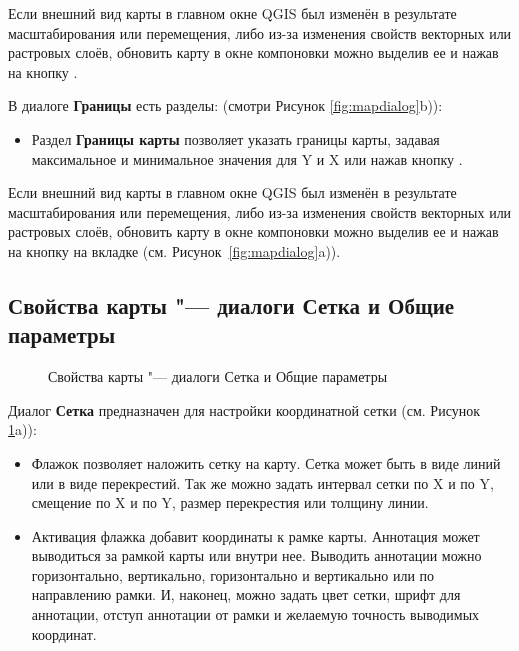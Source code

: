 Если внешний вид карты в главном окне QGIS был изменён в результате
масштабирования или перемещения, либо из-за изменения свойств векторных
или растровых слоёв, обновить карту в окне компоновки можно выделив ее
и нажав на кнопку .


В диалоге \textbf{Границы} есть разделы:
(смотри Рисунок \ref{fig:mapdialog}b)):

\begin{itemize}[label=--]
\item Раздел \textbf{Границы карты} позволяет указать границы карты,
задавая максимальное и минимальное значения для Y и X или нажав кнопку
.
\end{itemize}

Если внешний вид карты в главном окне QGIS был изменён в результате
масштабирования или перемещения, либо из-за изменения свойств векторных
или растровых слоёв, обновить карту в окне компоновки можно выделив ее
и нажав на кнопку  на вкладке  (см.
Рисунок~\ref{fig:mapdialog}a)).

\subsection{Свойства карты "--- диалоги Сетка и Общие параметры}

\begin{figure}[ht]
\centering
   \hspace{1cm}
   \caption{Свойства карты "--- диалоги Сетка и Общие параметры \nixcaption}\label{fig:sec_map_dialog}
\end{figure}


Диалог \textbf{Сетка} предназначен для настройки координатной сетки
(см. Рисунок \ref{fig:sec_map_dialog}a)):

\begin{itemize}[label=--]
\item Флажок  позволяет наложить сетку на
карту. Сетка может быть в виде линий или в виде перекрестий. Так же
можно задать интервал сетки по X и по Y, смещение по X и по Y, размер
перекрестия или толщину линии.
\item Активация флажка  добавит
координаты к рамке карты. Аннотация может выводиться за рамкой карты или
внутри нее. Выводить аннотации можно горизонтально, вертикально,
горизонтально и вертикально или по направлению рамки. И, наконец, можно
задать цвет сетки, шрифт для аннотации, отступ аннотации от рамки и
желаемую точность выводимых координат.
\end{itemize}

